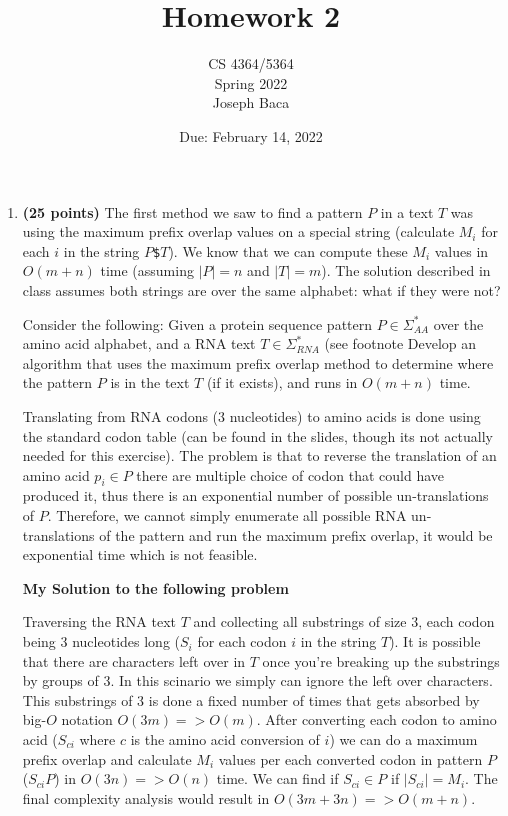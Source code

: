 \documentclass[11pt, oneside]{article}
\title{Homework 2}
\author{CS 4364/5364\\Spring 2022 \\ Joseph Baca}
\date{Due: February 14, 2022}
\begin{document}
\maketitle

\begin{enumerate}


	\item \textbf{(25 points)}
	      The first method we saw to find a pattern $P$ in a text $T$ was using the maximum prefix overlap values on a special string (calculate $M_i$ for each $i$ in the string $P$\texttt{\$}$T$).
	      We know that we can compute these $M_i$ values in $O(m+n)$ time (assuming $|P|=n$ and $|T|=m$).
	      The solution described in class assumes both strings are over the same alphabet: what if they were not?

	      Consider the following:
	      Given a protein sequence pattern $P\in\Sigma_{AA}^*$ over the amino acid alphabet, and a RNA text $T\in\Sigma_{RNA}^*$
	      (see footnote
	      Develop an algorithm that uses the maximum prefix overlap method to determine where the pattern $P$ is in the text $T$ (if it exists),
	      and runs in $O(m+n)$ time.

	      Translating from RNA codons (3 nucleotides) to amino acids is done using the standard codon table (can be found in the slides, though its not actually needed for this exercise).
	      The problem is that to reverse the translation of an amino acid $p_i \in P$ there are multiple choice of codon that could have produced it,
	      thus there is an exponential number of possible un-translations of $P$.
	      Therefore, we cannot simply enumerate all possible RNA un-translations of the pattern and run the maximum prefix overlap, it would be exponential time which is not feasible.


	\begin{center}
		\textbf{My Solution to the following problem}
	\end{center}

	Traversing the RNA text $T$ and collecting all substrings of size 3, each codon being 3 nucleotides long ($S_{i}$ for each codon $i$ in the string $T$). It is possible that there are characters left over in $T$ once you're breaking up the substrings by groups of 3. In this scinario we simply can ignore the left over characters. This substrings of 3 is done a fixed number of times that gets absorbed by big-$O$ notation $O(3m) => O(m)$. After converting each codon to amino acid ($S_{ci}$ where $c$ is the amino acid conversion of $i$) we can do a maximum prefix overlap and calculate $M_{i}$ values per each converted codon in pattern $P$ ($S_{ci}$\text{\$}$P$) in $O(3n) => O(n)$ time. We can find if $S_{ci} \in P$ if $|S_{ci}| = M_{i}$. The final complexity analysis would result in $O(3m+3n) => O(m+n)$.




\end{enumerate}
\end{document}
